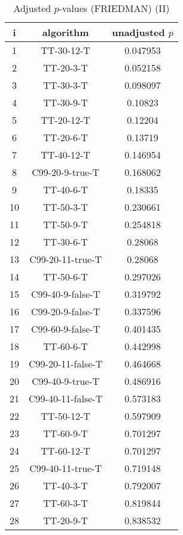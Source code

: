 \documentclass[a4paper,10pt]{article}
\begin{document}
\begin{landscape}
\begin{table}[!htp]
\centering\small
\begin{tabular}{ccc}
i&algorithm&unadjusted $p$\\
\hline1&TT-30-12-T&0.047953\\2&TT-20-3-T&0.052158\\3&TT-30-3-T&0.098097\\4&TT-30-9-T&0.10823\\5&TT-20-12-T&0.12204\\6&TT-20-6-T&0.13719\\7&TT-40-12-T&0.146954\\8&C99-20-9-true-T&0.168062\\9&TT-40-6-T&0.18335\\10&TT-50-3-T&0.230661\\11&TT-50-9-T&0.254818\\12&TT-30-6-T&0.28068\\13&C99-20-11-true-T&0.28068\\14&TT-50-6-T&0.297026\\15&C99-40-9-false-T&0.319792\\16&C99-20-9-false-T&0.337596\\17&C99-60-9-false-T&0.401435\\18&TT-60-6-T&0.442998\\19&C99-20-11-false-T&0.464668\\20&C99-40-9-true-T&0.486916\\21&C99-40-11-false-T&0.573183\\22&TT-50-12-T&0.597909\\23&TT-60-9-T&0.701297\\24&TT-60-12-T&0.701297\\25&C99-40-11-true-T&0.719148\\26&TT-40-3-T&0.792007\\27&TT-60-3-T&0.819844\\28&TT-20-9-T&0.838532\\\hline
\end{tabular}
\caption{Adjusted $p$-values (FRIEDMAN) (II)}
\end{table}

\newpage
\end{landscape}
\end{document}
